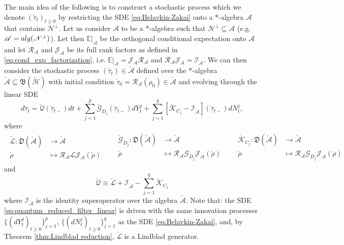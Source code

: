 \documentclass[aihp,12pt]{imsart}
\newcommand{\Gc}{\mathcal{G}}
\newcommand{\Hc}{\mathcal{H}}
\newcommand{\Jc}{\mathcal{J}}
\newcommand{\Rc}{\mathcal{R}}
\newcommand{\Qc}{\mathcal{Q}}
\newcommand{\Ic}{\mathcal{I}}
\newcommand{\Kc}{\mathcal{K}}
\newcommand{\Lc}{\mathcal{L}}
\newcommand{\As}{\mathscr{A}}
\newcommand{\Ns}{\mathscr{N}}
\newcommand{\Bf}{\mathfrak{B}}
\newcommand{\Df}{\mathfrak{D}}
\newcommand{\CE}{\mathbb{E}|}
\newcommand{\alg}{{\rm alg}}
\theoremstyle{theorem}
\theoremstyle{definition}
\theoremstyle{remark}
\begin{document}
The main idea of the following is to construct a stochastic process which we denote  $(\check{\tau}_t)_{t\geq0}$ by restricting the SDE \eqref{eq:Belavkin-Zakai} onto a $*$-algebra $\As$ that contains $\Ns^\perp$.
Let us consider $\As$ to be a $*$-algebra such that $\Ns^\perp\subseteq\As$ (e.g. $\As=\alg(\Ns^\perp)$). Let then $\CE_{\As}$ be the orthogonal conditional expectation onto $\As$ and let $\Rc_{\As}$ and $\Jc_{\As}$ be its full rank factors as defined in \eqref{eq:cond_exp_factorization}, i.e. $\CE_\As = \Jc_{\As}\Rc_{\As}$ and $\Rc_{\As}\Jc_{\As} = \Ic_{\check{\As}}$. We can then consider the stochastic process $(\check{\tau}_t)\in\check{\As}$ defined over the $*$-algebra $\check{\As}\subseteq\Bf(\check{\Hc})$ with initial condition $\check{\tau}_0 = \Rc_{\As}(\rho_0)\in\check{\As}$ and evolving through the linear SDE 
\begin{equation}
    d\check{\tau}_t = \check{\Qc}(\check{\tau}_{t-}) dt + \sum_{j=1}^p \check{\Gc}_{D_j}(\check{\tau}_{t-}) dY_t^j + \sum_{j=1}^q \left[\check{\Kc}_{C_j}-\Ic_{\check{\As}}\right](\check{\tau}_{t-}) dN_t^j,
    \label{eq:quantum_reduced_filter_linear}
\end{equation}
where
\begin{align}
\begin{split}
    \check{\Lc}:\Df(\check{\As})&\to\check{\As}\\
    \check{\rho}&\mapsto 
    \Rc_{\As} {\Lc}\Jc_{\As}(\check{\rho})
\end{split}&&
\begin{split}
    \check{\Gc}_{D_j}:\Df(\check{\As})&\to\check{\As}\\
    \check{\rho}&\mapsto 
    \Rc_{\As} {\Gc}_{D_j}\Jc_{\As}(\check{\rho})
\end{split}&&
\begin{split}
    \check{\Kc}_{C_j}:\Df(\check{\As})&\to\check{\As}\\
    \check{\rho}&\mapsto
    \Rc_{\As} {\Gc}_{D_j}\Jc_{\As}(\check{\rho})
\end{split}
\end{align}
and $$\check{\Qc} \equiv \check{\Lc} +\Ic_{\check{\As}} - \sum_{j=1}^q \check{\Kc}_{C_j}$$ where $\Ic_{\check{\As}}$ is the identity superoperator over the algebra $\check{\As}$. Note that: the SDE \eqref{eq:quantum_reduced_filter_linear} is driven with the same innovation processes $\{(dY_t^j)_{t\geq0}\}_{j=1}^p$, $\{(dN_t^j)_{t\geq0}\}_{j=1}^q$ as the SDE \eqref{eq:Belavkin-Zakai}, and, by Theorem \ref{thm:Lindblad reduction}, $\check{\Lc}$ is a Lindblad generator.
\end{document}
